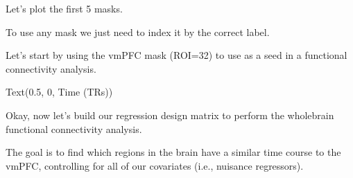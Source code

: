 \documentclass[letterpaper,10pt,english]{sphinxmanual}
\begin{document}
Let’s plot the first 5 masks.

\begin{sphinxVerbatim}[commandchars=\\\{\}]
  

  \PYG{p}{[}\PYG{p}{]}
\end{sphinxVerbatim}

\noindent{}

To use any mask we just need to index it by the correct label.

Let’s start by using the vmPFC mask (ROI=32) to use as a seed in a functional connectivity analysis.

\begin{sphinxVerbatim}[commandchars=\\\{\}]
  \PYG{p}{[}\PYG{p}{]}

 
 
 
\end{sphinxVerbatim}

\begin{sphinxVerbatim}[commandchars=\\\{\}]
Text(0.5, 0, \PYGZsq{}Time (TRs)\PYGZsq{})
\end{sphinxVerbatim}

\noindent{}

Okay, now let’s build our regression design matrix to perform the whole\sphinxhyphen{}brain functional connectivity analysis.

The goal is to find which regions in the brain have a similar time course to the vmPFC, controlling for all of our covariates (i.e., nuisance regressors).
\end{document}
